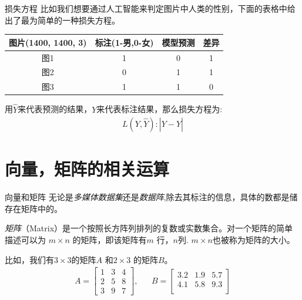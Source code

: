\documentclass[handout]{beamer}
\begin{document}
\begin{frame}{损失方程}
比如我们想要通过人工智能来判定图片中人类的性别，下面的表格中给出了最为简单的一种损失方程。
\begin{table}[H]
	\centering
	\renewcommand{\arraystretch}{1.5}
	\begin{tabular}{cccc}
	\hline 
		图片(1400, 1400, 3) & 标注(1-男,0-女) & 模型预测 & 差异\\
		\hline 
		图1 & 1 & 0 & 1 \\
		图2 & 0 & 1 & 1 \\
		图3 & 1 & 1 & 0 \\
		\hline 
	\end{tabular}
\end{table}
用$\hat{Y}$来代表预测的结果，$Y$来代表标注结果，那么损失方程为:
\begin{align*}
	L(Y, \hat{Y}): |Y-\hat{Y}| 
\end{align*}
\end{frame}



\section{向量，矩阵的相关运算}

\begin{frame}{向量和矩阵}
无论是\textit{多媒体数据集}还是\textit{数据阵},除去其标注的信息，具体的数都是储存在矩阵中的。
\begin{definition}
	\textit{矩阵}（Matrix）是一个按照长方阵列排列的复数或实数集合。对一个矩阵的简单描述可以为 $m \times n$ 的矩阵，即该矩阵有$m$ 行，$n$列. $m \times n$也被称为矩阵的大小。
\end{definition}
\begin{example}
比如，我们有$3 \times 3 $的矩阵$A$ 和$2 \times 3$ 的矩阵$B$。
\begin{align*}
	 A = \begin{bmatrix}
	1 & 3 & 4 \\
	2 & 5 & 8 \\
	3 & 9 & 7
\end{bmatrix}, & & B = \begin{bmatrix}
	3.2 & 1.9 & 5.7 \\
	4.1 & 5.8 & 9.3 \\
\end{bmatrix}
\end{align*}	
\end{example}
\end{frame}
\end{document}
